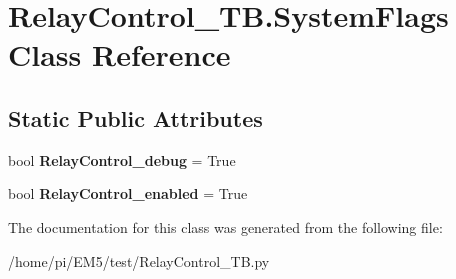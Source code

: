 \hypertarget{classRelayControl__TB_1_1SystemFlags}{}\section{Relay\+Control\+\_\+\+T\+B.\+System\+Flags Class Reference}
\label{classRelayControl__TB_1_1SystemFlags}
\subsection*{Static Public Attributes}
\begin{DoxyCompactItemize}
\item 
\mbox{\label{classRelayControl__TB_1_1SystemFlags_a0a6eee45ad347ead5d7bc0e18b7f8d7c}} 
bool {\bfseries Relay\+Control\+\_\+debug} = True
\item 
\mbox{\label{classRelayControl__TB_1_1SystemFlags_a8df67129863d66f0bef3c105d41aa5c1}} 
bool {\bfseries Relay\+Control\+\_\+enabled} = True
\end{DoxyCompactItemize}


The documentation for this class was generated from the following file\+:\begin{DoxyCompactItemize}
\item 
/home/pi/\+E\+M5/test/Relay\+Control\+\_\+\+T\+B.\+py\end{DoxyCompactItemize}

